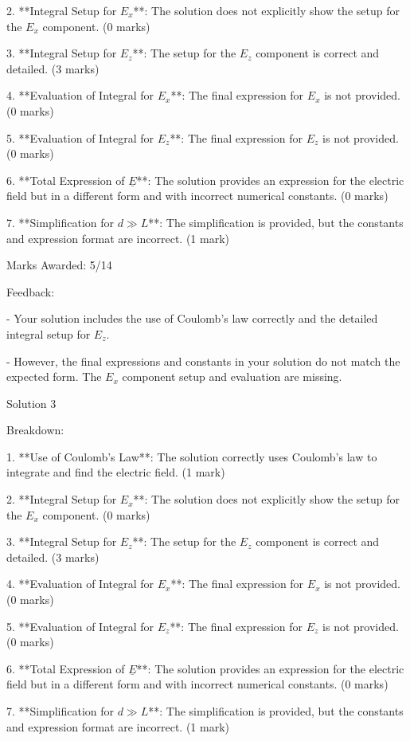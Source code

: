 \documentclass[a4paper,11pt]{article}
\begin{document}
2. **Integral Setup for \(E_x\)**: The solution does not explicitly show the setup for the \(E_x\) component. (0 marks)

3. **Integral Setup for \(E_z\)**: The setup for the \(E_z\) component is correct and detailed. (3 marks)

4. **Evaluation of Integral for \(E_x\)**: The final expression for \(E_x\) is not provided. (0 marks)

5. **Evaluation of Integral for \(E_z\)**: The final expression for \(E_z\) is not provided. (0 marks)

6. **Total Expression of \( \underline{E} \)**: The solution provides an expression for the electric field but in a different form and with incorrect numerical constants. (0 marks)

7. **Simplification for \( d \gg L \)**: The simplification is provided, but the constants and expression format are incorrect. (1 mark)

Marks Awarded: 5/14

Feedback:

- Your solution includes the use of Coulomb's law correctly and the detailed integral setup for \(E_z\). 

- However, the final expressions and constants in your solution do not match the expected form. The \(E_x\) component setup and evaluation are missing.

Solution 3

Breakdown:

1. **Use of Coulomb's Law**: The solution correctly uses Coulomb's law to integrate and find the electric field. (1 mark)

2. **Integral Setup for \(E_x\)**: The solution does not explicitly show the setup for the \(E_x\) component. (0 marks)

3. **Integral Setup for \(E_z\)**: The setup for the \(E_z\) component is correct and detailed. (3 marks)

4. **Evaluation of Integral for \(E_x\)**: The final expression for \(E_x\) is not provided. (0 marks)

5. **Evaluation of Integral for \(E_z\)**: The final expression for \(E_z\) is not provided. (0 marks)

6. **Total Expression of \( \underline{E} \)**: The solution provides an expression for the electric field but in a different form and with incorrect numerical constants. (0 marks)

7. **Simplification for \( d \gg L \)**: The simplification is provided, but the constants and expression format are incorrect. (1 mark)
\end{document}
